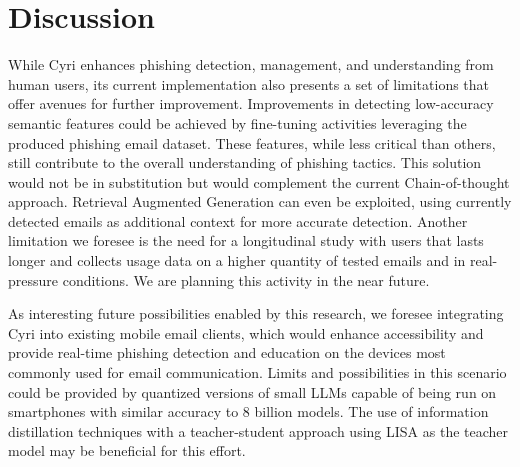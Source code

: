 \section{Discussion}
\label{sec:discussion}
While Cyri enhances phishing detection, management, and understanding from human users, its current implementation also presents a set of limitations that offer avenues for further improvement.
Improvements in detecting low-accuracy semantic features could be achieved by fine-tuning activities leveraging the produced phishing email dataset. These features, while less critical than others, still contribute to the overall understanding of phishing tactics. This solution would not be in substitution but would complement the current Chain-of-thought approach. Retrieval Augmented Generation can even be exploited, using currently detected emails as additional context for more accurate detection.
Another limitation we foresee is the need for a longitudinal study with users that lasts longer and collects usage data on a higher quantity of tested emails and in real-pressure conditions. We are planning this activity in the near future.


As interesting future possibilities enabled by this research, we foresee integrating Cyri into existing mobile email clients, which would enhance accessibility and provide real-time phishing detection and education on the devices most commonly used for email communication. Limits and possibilities in this scenario could be provided by quantized versions of small LLMs capable of being run on smartphones with similar accuracy to 8 billion models. The use of information distillation techniques with a teacher-student approach using LISA as the teacher model may be beneficial for this effort.

